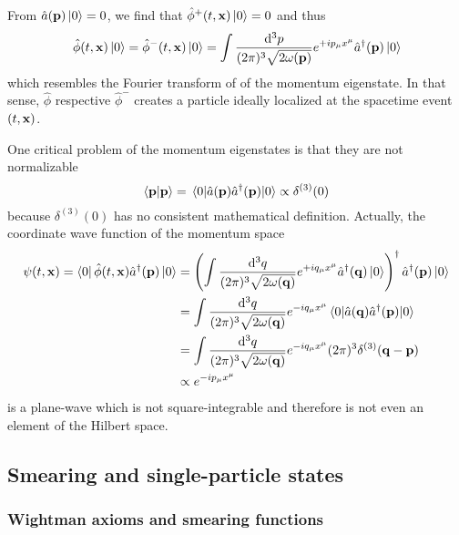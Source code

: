 From $\hat{a}(\vb{p})\ket{0}=0$, we find that $\hat\phi^+(t,\vb{x})\ket{0}=0$ and thus
\begin{equation}
	\hat\phi(t,\vb{x})
	\ket{0}
	=
	\hat\phi^-(t,\vb{x})
	\ket{0}
	=
	\int\frac{\dd[3]{p}}{(2\pi)^3\sqrt{2\omega(\vb{p})}}
	e^{+ip_\mu x^\mu}
	\hat{a}^\dagger(\vb{p})
	\ket{0}
\end{equation}
which resembles the Fourier transform of of the momentum eigenstate.
In that sense, $\hat\phi$ respective $\hat\phi^-$ creates a particle ideally localized at the spacetime event $(t,\vb{x})$.

One critical problem of the momentum eigenstates is that they are not normalizable
\begin{equation}
	\bra{\vb{p}}\ket{\vb{p}}
	=
	\expval{\hat{a}(\vb{p})\hat{a}^\dagger(\vb{p})}{0}
	\propto
	\delta^{(3)}(0)
\end{equation}
because $\delta^{(3)}(0)$ has no consistent mathematical definition.
Actually, the coordinate wave function of the momentum space~\cite[p.~25]{Peskin1995}
\begin{equation}
	\begin{split}
		\psi(t,\vb{x})
		=
		\bra{0}
		\hat\phi(t,\vb{x})
		\hat{a}^\dagger(\vb{p})
		\ket{0}
		&=
		\left(
			\int\frac{\dd[3]{q}}{(2\pi)^3\sqrt{2\omega(\vb{q})}}
			e^{+iq_\mu x^\mu}
			\hat{a}^\dagger(\vb{q})
			\ket{0}
		\right)^\dagger
		\hat{a}^\dagger(\vb{p})
		\ket{0}
		\\
		&=
		\int\frac{\dd[3]{q}}{(2\pi)^3\sqrt{2\omega(\vb{q})}}
		e^{-iq_\mu x^\mu}
		\expval{\hat{a}(\vb{q})\hat{a}^\dagger(\vb{p})}{0}
		\\
		&=
		\int\frac{\dd[3]{q}}{(2\pi)^3\sqrt{2\omega(\vb{q})}}
		e^{-iq_\mu x^\mu}
		(2\pi)^3
		\delta^{(3)}(\vb{q}-\vb{p})
		\\
		&\propto
		e^{-ip_\mu x^\mu}
	\end{split}
\end{equation}
is a plane-wave which is not square-integrable and therefore is not even an element of the Hilbert space.

\subsection{Smearing and single-particle states}

\subsubsection{Wightman axioms and smearing functions}

